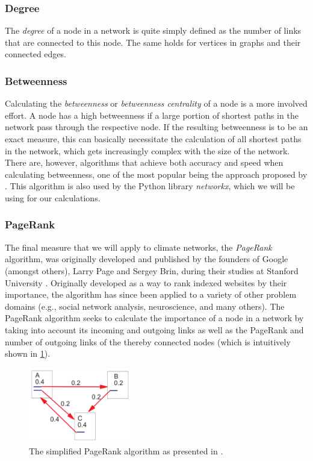 \subsubsection{Degree}
The \textit{degree} of a node in a network is quite simply defined as the number of links that are connected to this node. The same holds for vertices in graphs and their connected edges.

\subsubsection{Betweenness}
Calculating the \textit{betweenness} or \textit{betweenness centrality} of a node is a more involved effort. A node has a high betweenness if a large portion of shortest paths in the network pass through the respective node. If the resulting betweenness is to be an exact measure, this can basically necessitate the calculation of all shortest paths in the network, which gets increasingly complex with the size of the network. There are, however, algorithms that achieve both accuracy and speed when calculating betweenness, one of the most popular being the approach proposed by \citet{Brandes.2001}. This algorithm is also used by the Python library \textit{networkx}, which we will be using for our calculations.

\subsubsection{PageRank}
The final measure that we will apply to climate networks, the \textit{PageRank} algorithm, was originally developed and published by the founders of Google (amongst others), Larry Page and Sergey Brin, during their studies at Stanford University \citep{Page.1999}. Originally developed as a way to rank indexed websites by their importance, the algorithm has since been applied to a variety of other problem domains (e.g., social network analysis, neuroscience, and many others). The PageRank algorithm seeks to calculate the importance of a node in a network by taking into account its incoming and outgoing links as well as the PageRank and number of outgoing links of the thereby connected nodes (which is intuitively shown in \cref{fig:simplified_pagerank}).

\begin{figure}[h]
  \centering
  \includegraphics[width=0.4\textwidth]{./99_appendix/img/simplified_pagerank}
  \caption{The simplified PageRank algorithm as presented in \citet{Page.1999}.}
  \label{fig:simplified_pagerank}
\end{figure}

